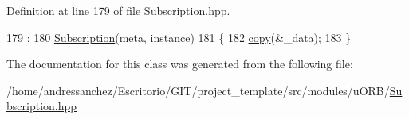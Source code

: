 Definition at line 179 of file Subscription.\+hpp.


\begin{DoxyCode}
179                                                                      :
180         \hyperlink{classuORB_1_1Subscription_a6afd37f8aa13bc3ffeafd29b7a3d434f}{Subscription}(meta, instance)
181     \{
182         \hyperlink{classuORB_1_1Subscription_a17a37eb5624b409379db434400de4582}{copy}(&\_data);
183     \}
\end{DoxyCode}


The documentation for this class was generated from the following file\+:\begin{DoxyCompactItemize}
\item 
/home/andressanchez/\+Escritorio/\+G\+I\+T/project\+\_\+template/src/modules/u\+O\+R\+B/\hyperlink{Subscription_8hpp}{Subscription.\+hpp}\end{DoxyCompactItemize}
